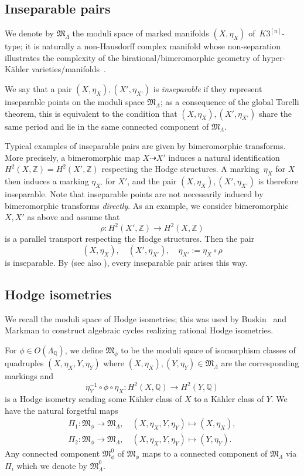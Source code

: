 \documentclass[11pt]{amsart}
\theoremstyle{plain}
\theoremstyle{definition}
\theoremstyle{remark}
\newcommand{\BQ}{{\mathbb{Q}}}
\newcommand{\BZ}{{\mathbb{Z}}}
\newcommand{\FM}{{\mathfrak{M}}}
\begin{document}
\subsection{Inseparable pairs}\label{sect1.1}
We denote by $\FM_\Lambda$ the moduli space of marked manifolds $(X,\eta_X)$ of~$K3^{[n]}$-type; it is naturally a non-Hausdorff complex manifold whose non-separation illustrates the complexity of the birational/bimeromorphic geometry of hyper-K\"ahler varieties/manifolds~\cite{H1}.

We say that a pair $(X,\eta_X), (X', \eta_{X'})$ is \emph{inseparable} if they represent inseparable points on the moduli space $\FM_{\Lambda}$; as a consequence of the global Torelli theorem, this is equivalent to the condition that $(X, \eta_X), (X', \eta_{X'})$ share the same period and lie in the same connected component of $\FM_{\Lambda}$.

Typical examples of inseparable pairs are given by bimeromorphic transforms. More precisely, a bimeromorphic map $X \dashrightarrow X'$ induces a natural identification $H^2(X, \BZ) = H^2(X', \BZ)$ respecting the Hodge structures. A marking~$\eta_X$ for $X$ then induces a marking $\eta_{X'}$ for $X'$, and the pair $(X, \eta_X), (X',\eta_{X'})$ is therefore inseparable. Note that inseparable points are not necessarily induced by bimeromorphic transforms \emph{directly}. As an example, we consider bimeromorphic $X,X'$ as above and assume that
\[
\rho: H^2(X', \BZ) \to H^2(X, \BZ)
\]
is a parallel transport respecting the Hodge structures. Then the pair 
\[
(X, \eta_X), \quad (X', \eta_{X'}), \quad \eta_{X'}:= \eta_X \circ \rho
\]
is inseparable. By \cite{H1} (see also \cite[Section 3.1]{Torelli}), every inseparable pair arises this way.


\subsection{Hodge isometries}

We recall the moduli space of Hodge isometries; this was used by Buskin~\cite{Buskin} and Markman \cite{Markman} to construct algebraic cycles realizing rational Hodge isometries. 

For $\phi \in O(\Lambda_\BQ)$, we define $\FM_{\phi}$ to be the moduli space of isomorphism classes of quadruples $(X, \eta_X, Y, \eta_Y)$ where $(X, \eta_X), (Y, \eta_Y) \in \mathfrak{M}_{\Lambda}$ are the corresponding markings and 
\[
\eta_Y^{-1}\circ \phi \circ \eta_X: H^2(X, \BQ) \to H^2(Y,\BQ)
\]
is a Hodge isometry sending some K\"ahler class of $X$ to a K\"ahler class of $Y$. We have the natural forgetful maps
\begin{gather*}
\Pi_1:  \FM_{\phi} \to \FM_\Lambda, \quad (X,\eta_X, Y, \eta_Y) \mapsto (X, \eta_X), \\
\Pi_2:  \FM_{\phi} \to \FM_\Lambda, \quad (X,\eta_X, Y, \eta_Y) \mapsto (Y, \eta_Y).
\end{gather*}
Any connected component $\FM^0_\phi $ of $\FM_\phi$ maps to a connected component of $\FM_\Lambda$ via $\Pi_i$ which  we denote by $\FM^0_\Lambda$.
\end{document}
